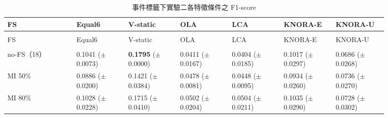 \begingroup
\small{}\setlength{\tabcolsep}{3pt}
\setlength{\LTleft}{\fill}\setlength{\LTright}{\fill}
\begin{longtable}{@{}>{\raggedright\arraybackslash}p{0.16\linewidth}>{\raggedright\arraybackslash}p{0.123\linewidth}>{\raggedright\arraybackslash}p{0.123\linewidth}>{\raggedright\arraybackslash}p{0.123\linewidth}>{\raggedright\arraybackslash}p{0.123\linewidth}>{\raggedright\arraybackslash}p{0.123\linewidth}>{\raggedright\arraybackslash}p{0.123\linewidth}@{}}
\caption{事件標籤下實驗二各特徵條件之 F1-score}\label{tab:results-fs-f1}\\
\toprule
FS & Equal6 & V-static & OLA & LCA & KNORA-E & KNORA-U \\
\midrule\endfirsthead
\multicolumn{7}{c}{表~\thetable（續）}\\
\toprule
FS & Equal6 & V-static & OLA & LCA & KNORA-E & KNORA-U \\
\midrule\endhead
\midrule\multicolumn{7}{r}{續下頁}\\\endfoot
\bottomrule\endlastfoot
no-FS（18） & \shortstack[l]{0.1041\\{\scriptsize(\(\pm\)0.0073)}} & \shortstack[l]{\textbf{0.1795}\\{\scriptsize(\(\pm\)0.0000)}} & \shortstack[l]{0.0411\\{\scriptsize(\(\pm\)0.0167)}} & \shortstack[l]{0.0404\\{\scriptsize(\(\pm\)0.0185)}} & \shortstack[l]{0.1017\\{\scriptsize(\(\pm\)0.0297)}} & \shortstack[l]{0.0686\\{\scriptsize(\(\pm\)0.0268)}} \\
MI 50\% & \shortstack[l]{0.0886\\{\scriptsize(\(\pm\)0.0200)}} & \shortstack[l]{0.1421\\{\scriptsize(\(\pm\)0.0384)}} & \shortstack[l]{0.0478\\{\scriptsize(\(\pm\)0.0081)}} & \shortstack[l]{0.0448\\{\scriptsize(\(\pm\)0.0095)}} & \shortstack[l]{0.0934\\{\scriptsize(\(\pm\)0.0260)}} & \shortstack[l]{0.0736\\{\scriptsize(\(\pm\)0.0270)}} \\
MI 80\% & \shortstack[l]{0.1028\\{\scriptsize(\(\pm\)0.0228)}} & \shortstack[l]{0.1715\\{\scriptsize(\(\pm\)0.0410)}} & \shortstack[l]{0.0502\\{\scriptsize(\(\pm\)0.0204)}} & \shortstack[l]{0.0504\\{\scriptsize(\(\pm\)0.0211)}} & \shortstack[l]{0.1035\\{\scriptsize(\(\pm\)0.0290)}} & \shortstack[l]{0.0728\\{\scriptsize(\(\pm\)0.0302)}} \\

\end{longtable}

